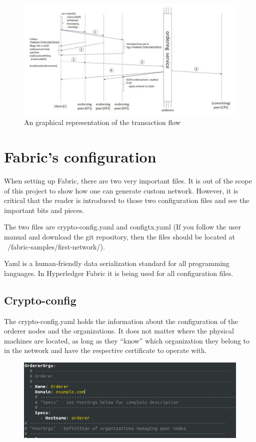 \documentclass[a4paper,11pt]{report}
\begin{document}
\begin{figure}[h]
\centering
  \includegraphics[width=16cm]{image_preview-7.jpeg}
  \caption{An graphical representation of the transaction flow \cite{transactionFlow} }
  \label{transactionFlow}
\end{figure}


\section{Fabric's configuration}
When setting up Fabric, there are two very important files. It is out of the scope of this project to show how one can generate custom network. However, it is critical that the reader is introduced to those two configuration files and see the important bits and pieces. 

	The two files are crypto-config.yaml and configtx.yaml (If you follow the user manual and download the git repository, then the files should be located at ~/fabric-samples/first-network/). 
	
	Yaml is a human-friendly data serialization standard for all programming languages. In Hyperledger Fabric it is being used for all configuration files. 

\subsection{Crypto-config}

The crypto-config.yaml holds the information about the configuration of the orderer nodes and the organizations. It does not matter where the physical machines are located, as long as they “know” which organization they belong to in the network and have the respective certificate to operate with.

\begin{figure}[h]
\centering
  \includegraphics[width = 16cm]{cryptoconfig1.png}
  \caption{ }
  \label{cryptoconfig1}
\end{figure}
\end{document}
